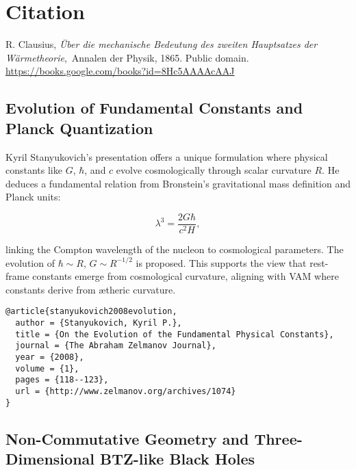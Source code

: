 \section*{Citation}
\begingroup
\renewcommand{\section}[2]{}%
\begin{thebibliography}{9}

R. Clausius, \textit{\"Uber die mechanische Bedeutung des zweiten Hauptsatzes der W\"armetheorie},\ Annalen der Physik, 1865. Public domain. \\ \url{https://books.google.com/books?id=8Hc5AAAAcAAJ}

\end{thebibliography}
\endgroup


\subsection{Evolution of Fundamental Constants and Planck Quantization}

Kyril Stanyukovich's presentation \cite{stanyukovich2008evolution} offers a unique formulation where physical constants like $G$, $\hbar$, and $c$ evolve cosmologically through scalar curvature $R$. He deduces a fundamental relation from Bronstein’s gravitational mass definition and Planck units:

\begin{equation}
\lambda^3 = \frac{2G\hbar}{c^2 H},
\end{equation}

linking the Compton wavelength of the nucleon to cosmological parameters. The evolution of $\hbar \sim R$, $G \sim R^{-1/2}$ is proposed. This supports the view that rest-frame constants emerge from cosmological curvature, aligning with VAM where constants derive from ætheric curvature.

\begin{verbatim}
@article{stanyukovich2008evolution,
  author = {Stanyukovich, Kyril P.},
  title = {On the Evolution of the Fundamental Physical Constants},
  journal = {The Abraham Zelmanov Journal},
  year = {2008},
  volume = {1},
  pages = {118--123},
  url = {http://www.zelmanov.org/archives/1074}
}
\end{verbatim}

\subsection{Non-Commutative Geometry and Three-Dimensional BTZ-like Black Holes}

